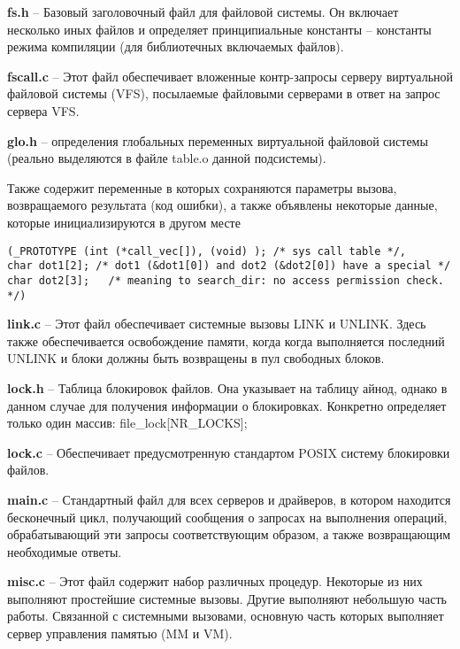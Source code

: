 \textbf{fs.h} -- Базовый заголовочный файл для файловой системы. Он включает несколько иных файлов и определяет принципиальные константы -- константы режима компиляции (для библиотечных включаемых файлов).

\textbf{fscall.c} -- Этот файл обеспечивает вложенные контр-запросы серверу виртуальной файловой системы (VFS), посылаемые файловыми серверами в ответ на запрос сервера VFS.

\textbf{glo.h} --  определения глобальных переменных виртуальной файловой системы (реально выделяются в файле table.o данной подсистемы).

Также содержит переменные в которых сохраняются параметры вызова, возвращаемого результата (код ошибки), а также объявлены некоторые данные, которые инициализируются в другом месте
\begin{Verbatim}[frame=single]
(_PROTOTYPE (int (*call_vec[]), (void) ); /* sys call table */,
char dot1[2]; /* dot1 (&dot1[0]) and dot2 (&dot2[0]) have a special */
char dot2[3];   /* meaning to search_dir: no access permission check. */)
\end{Verbatim}

\textbf{link.c} -- Этот файл обеспечивает системные вызовы LINK и UNLINK. Здесь также обеспечивается освобождение памяти, когда когда выполняется последний UNLINK и блоки должны быть возвращены в пул свободных блоков.

\textbf{lock.h} -- Таблица блокировок файлов. Она указывает на таблицу айнод, однако в данном случае для получения информации о блокировках. Конкретно определяет только один массив: file\_lock[NR\_LOCKS];

\textbf{lock.c} -- Обеспечивает предусмотренную стандартом POSIX систему блокировки файлов.

\textbf{main.c} -- Стандартный файл для всех серверов и драйверов, в котором находится бесконечный цикл, получающий сообщения о запросах на выполнения операций, обрабатывающий эти запросы соответствующим образом, а также возвращающим необходимые ответы.

\textbf{misc.c} -- Этот файл содержит набор различных процедур. Некоторые из них выполняют простейшие системные вызовы. Другие выполняют небольшую часть работы. Связанной с системными вызовами, основную часть которых выполняет сервер управления памятью (MM и VM).

